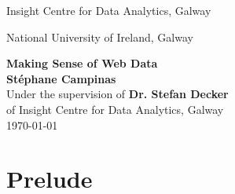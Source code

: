 \documentclass[12pt,chapterprefix=true]{scrbook}
\begin{document}
\begin{titlepage}
	\begin{center}
		\null
		\vspace{2cm}
		{\Large
		Insight Centre for Data Analytics, Galway\\
		\begin{figure}[h]
			\centering
		\end{figure}
		National University of Ireland, Galway\\
		\begin{figure}[h]
			\centering
		\end{figure}
		}
		\vspace{2cm}
		{\Huge \textbf{Making Sense of Web Data}}\\
		\vspace{1cm}
		{\Large \textbf{St\'ephane Campinas}}\\
		\vspace{1cm}
		Under the supervision of \textbf{Dr. Stefan Decker}\\
		of Insight Centre for Data Analytics, Galway\\
		\vspace{2cm}
		\today
	\end{center}
\end{titlepage}


%

\cleardoubleoddpage
\setcounter{tocdepth}{1}
\tableofcontents
\cleardoubleoddpage
\listoffigures
\listoftables
\listoftheorems[ignoreall,show={definition},numwidth=3.5em]
\printglossaries
\cleardoubleoddpage
{}

\part{Prelude}






%
\end{document}
